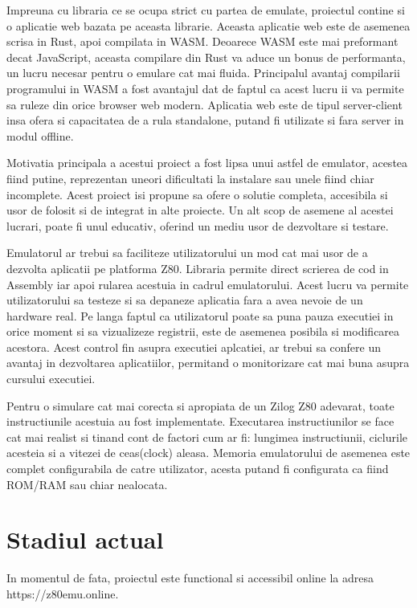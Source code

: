 \documentclass[titlepage,12pt]{article}
\DeclareRobustCommand{\code}[1]{{\ttfamily\small #1}}
\begin{document}
Impreuna cu libraria ce se ocupa strict cu partea de emulate, proiectul contine si o aplicatie web bazata pe aceasta librarie.
Aceasta aplicatie web este de asemenea scrisa in Rust, apoi compilata in \ac {WASM}. Deoarece \ac {WASM} este mai preformant decat JavaScript, aceasta compilare din Rust va aduce un bonus de performanta, un lucru necesar pentru o emulare cat mai fluida.
Principalul avantaj compilarii programului in \ac {WASM} a fost avantajul dat de faptul ca acest lucru ii va permite sa ruleze din orice browser web modern.
Aplicatia web este de tipul server-client insa ofera si capacitatea de a rula standalone, putand fi utilizate si fara server in modul offline.

Motivatia principala a acestui proiect a fost lipsa unui astfel de emulator, acestea fiind putine, reprezentan uneori dificultati la instalare sau unele fiind chiar incomplete.
Acest proiect isi propune sa ofere o solutie completa, accesibila si usor de folosit si de integrat in alte proiecte. Un alt scop de asemene al acestei lucrari, poate fi unul educativ, oferind un mediu usor de dezvoltare si testare.

Emulatorul ar trebui sa faciliteze utilizatorului un mod cat mai usor de a dezvolta aplicatii pe platforma Z80.
Libraria permite direct scrierea de cod in Assembly iar apoi rularea acestuia in cadrul emulatorului. Acest lucru va permite utilizatorului sa testeze si sa depaneze aplicatia fara a avea nevoie de un hardware real.
Pe langa faptul ca utilizatorul poate sa puna pauza executiei in orice moment si sa vizualizeze registrii, este de asemenea posibila si modificarea acestora.
Acest control fin asupra executiei aplcatiei, ar trebui sa confere un avantaj in dezvoltarea aplicatiilor, permitand o monitorizare cat mai buna asupra cursului executiei.

Pentru o simulare cat mai corecta si apropiata de un Zilog Z80 adevarat, toate instructiunile acestuia au fost implementate.
Executarea instructiunilor se face cat mai realist si tinand cont de factori cum ar fi: lungimea instructiunii, ciclurile acesteia si a vitezei de ceas(clock) aleasa.
Memoria emulatorului de asemenea este complet configurabila de catre utilizator, acesta putand fi configurata ca fiind \ac {ROM}/\ac {RAM} sau chiar nealocata.

\clearpage


\section{Stadiul actual}
In momentul de fata, proiectul este functional si accessibil online la adresa \code{https://z80emu.online}.
\end{document}
